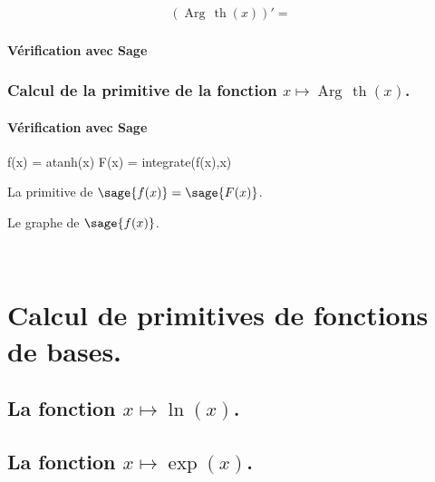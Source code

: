 \documentclass[a4paper,14pt]{extreport} %
\renewcommand{\tanh}{\mathop{\mathrm{th}}}
\renewcommand{\arg}{\mathop{\mathrm{Arg\,}}}
\begin{document}
\begin{align*}
(\arg \tanh(x))' = &
\end{align*}


\subsubsection{Vérification avec Sage}



\subsection{Calcul de la primitive de la fonction  $x \mapsto \arg \tanh(x)$.}




\subsubsection{Vérification avec Sage}

\begin{sageblock}
    f(x) = atanh(x)
    F(x) = integrate(f(x),x)
\end{sageblock}


La primitive de $\sage{f(x)} = \sage{F(x)} $.



Le graphe de $\sage{f(x)} $.


\begin{center}
 \\
\end{center}








\chapter{Calcul de primitives de fonctions de bases.}


\section{La fonction  $x \mapsto \ln(x) $.}



\section{La fonction  $x \mapsto \exp(x) $.}
\end{document}
